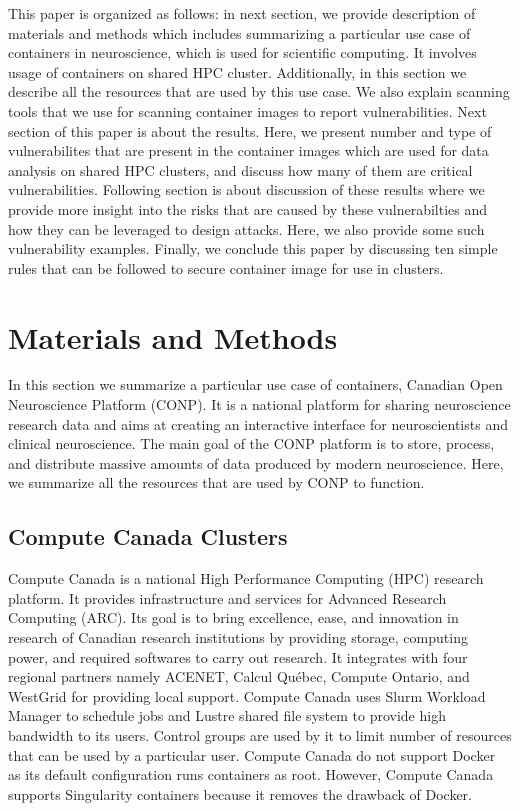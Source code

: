 \documentclass[a4paper,num-refs]{oup-contemporary}
\begin{document}
This paper is organized as follows: in next section, we provide description
of materials and methods which includes summarizing a particular use case of
containers in neuroscience, which is used for scientific computing. It involves
usage of containers on shared HPC cluster. Additionally, in this section we
describe all the resources that are used by this use case. We also explain
scanning tools that we use for scanning container images to report
vulnerabilities. Next section of this paper is about the results. Here, we
present number and type of vulnerabilites that are present in the container images
which are used for data analysis on shared HPC clusters, and discuss how many of them are
critical vulnerabilities. Following section is about discussion of these results
where we provide more insight into the risks that are caused by these vulnerabilties
and how they can be leveraged to design attacks. Here, we also provide some such
vulnerability examples. Finally, we conclude this paper by discussing ten simple
rules that can be followed to secure container image for use in clusters.

\section{Materials and Methods}

In this section we summarize a particular use case of containers, Canadian
Open Neuroscience Platform (CONP). It is a national platform for sharing neuroscience
research data and aims at creating an interactive interface for neuroscientists and
clinical neuroscience. The main goal of the CONP platform is to store, process, and
distribute massive amounts of data produced by modern neuroscience.
Here, we summarize all the resources that are
used by CONP to function.

\subsection{Compute Canada Clusters}

Compute Canada is a national High Performance Computing (HPC) research platform.
It provides infrastructure and services for Advanced Research Computing (ARC).
Its goal is to bring excellence, ease, and innovation in research of Canadian
research institutions by providing storage, computing power, and required
softwares to carry out research.
It integrates with four regional partners namely ACENET, Calcul Québec, Compute
Ontario, and WestGrid for providing local support.
Compute Canada uses Slurm Workload Manager to schedule jobs and Lustre shared
file system to provide high bandwidth to its users.
Control groups are used by it to limit number of resources that can be used
by a particular user.
Compute Canada do not support Docker as its default configuration
runs containers as root. However, Compute Canada supports Singularity
containers because it removes the drawback of Docker.
\end{document}
